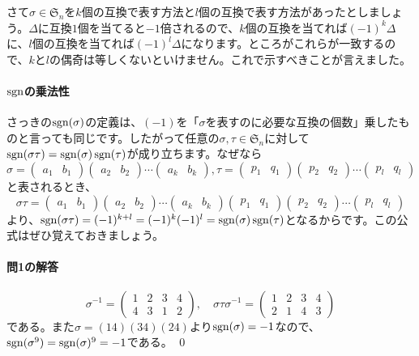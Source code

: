 さて$\sigma \in \mathfrak{S}_n$を$k$個の互換で表す方法と$l$個の互換で表す方法があったとしましょう。$\Delta$に互換$1$個を当てると$-1$倍されるので、$k$個の互換を当てれば$(-1)^k\Delta$に、$l$個の互換を当てれば$(-1)^l\Delta$になります。ところがこれらが一致するので、$k$と$l$の偶奇は等しくないといけません。これで示すべきことが言えました。

\paragraph{$\operatorname{sgn}$の乗法性}

さっきの$\operatorname{sgn}(\sigma)$の定義は、$(-1)$を「$\sigma$を表すのに必要な互換の個数」乗したものと言っても同じです。したがって任意の$\sigma, \tau \in \mathfrak{S}_n$に対して$\operatorname{sgn}(\sigma\tau) = \operatorname{sgn}(\sigma)\operatorname{sgn}(\tau)$が成り立ちます。なぜなら
\[
\sigma =
\begin{pmatrix}
a_1 & b_1
\end{pmatrix}
\begin{pmatrix}
a_2 & b_2
\end{pmatrix}
\cdots
\begin{pmatrix}
a_k & b_k
\end{pmatrix}, 
\tau =
\begin{pmatrix}
p_1 & q_1
\end{pmatrix}
\begin{pmatrix}
p_2 & q_2
\end{pmatrix}
\cdots
\begin{pmatrix}
p_l & q_l
\end{pmatrix}
\]
と表されるとき、
\[
\sigma \tau = 
\begin{pmatrix}
a_1 & b_1
\end{pmatrix}
\begin{pmatrix}
a_2 & b_2
\end{pmatrix}
\cdots
\begin{pmatrix}
a_k & b_k
\end{pmatrix}
\begin{pmatrix}
p_1 & q_1
\end{pmatrix}
\begin{pmatrix}
p_2 & q_2
\end{pmatrix}
\cdots
\begin{pmatrix}
p_l & q_l
\end{pmatrix}
\]
より、$\operatorname{sgn}(\sigma\tau) = (-1)^{k + l} = (-1)^k (-1)^l = \operatorname{sgn}(\sigma) \operatorname{sgn}(\tau)$となるからです。この公式はぜひ覚えておきましょう。

\paragraph{問1の解答}
\[
\sigma^{-1} = 
\begin{pmatrix}
1 & 2 & 3 & 4 \\
4 & 3 & 1 & 2
\end{pmatrix}, \quad
\sigma \tau \sigma^{-1} =
\begin{pmatrix}
1 & 2 & 3 & 4 \\
2 & 1 & 4 & 3
\end{pmatrix}
\]
である。また$\sigma = (14)(34)(24)$より$\operatorname{sgn}(\sigma) = -1$なので、$\operatorname{sgn}(\sigma^9) = \operatorname{sgn}(\sigma)^9 = -1$である。 \qed

